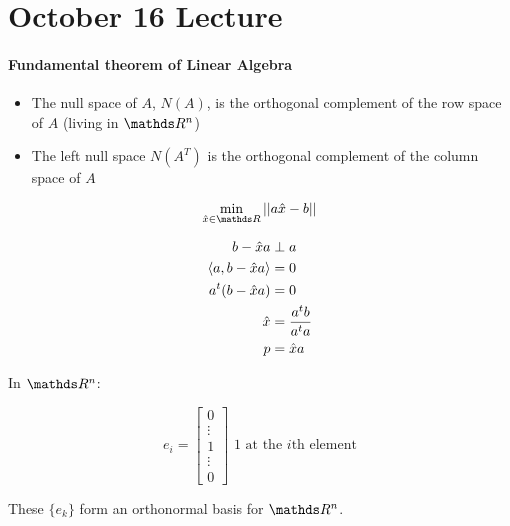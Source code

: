 \section{October 16 Lecture}

\paragraph{Fundamental theorem of Linear Algebra}
\begin{itemize}
  \item The null space of $A$, $N(A)$, is the orthogonal complement of the row space of $A$ (living in $\bbR^n$)
  \item The left null space $N(A^T)$ is the orthogonal complement of the column space of $A$
\end{itemize}

\[
  \min_{\hat{x} \in \bbR} \norm{a \hat{x} - b}
\]

\begin{align*}
  b-\hat{x}a &\perp a \\
  \langle a,b-\hat{x}a\rangle &= 0\\
  a^t(b-\hat{x}a) &= 0\\
  \hat{x} &= {a^t b \over a^t a} \\
  p &= \hat{x} a
\end{align*}

In $\bbR^n$:

\[
  e_i = \begin{bmatrix}
    0 \\ \vdots \\ 1 \\ \vdots \\ 0
  \end{bmatrix} \text{ 1 at the } i\text{th element}
\]

These $\{e_k\}$ form an orthonormal basis for $\bbR^n$.

